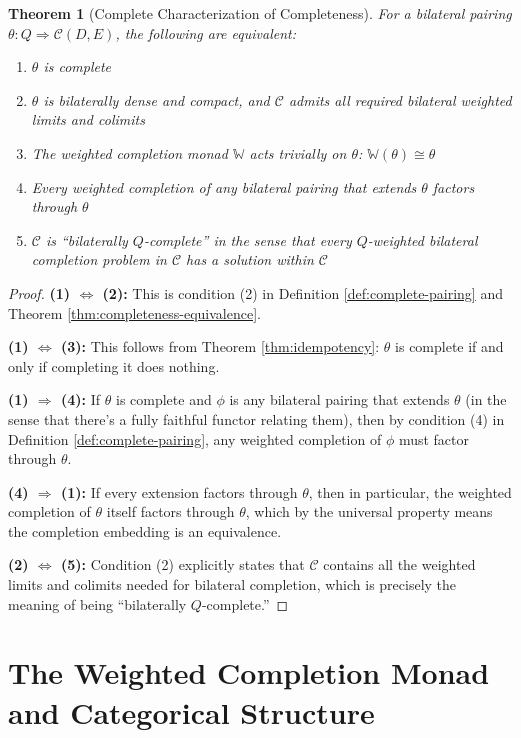 \documentclass[11pt]{article}
\theoremstyle{plain}
\newtheorem{theorem}{Theorem}[section]
\theoremstyle{definition}
\theoremstyle{remark}
\newcommand{\C}{\mathcal{C}}
\begin{document}
\begin{theorem}[Complete Characterization of Completeness]\label{thm:complete-characterization}
For a bilateral pairing $\theta : Q \Rightarrow \C(D, E)$, the following are equivalent:

\begin{enumerate}
\item $\theta$ is complete
\item $\theta$ is bilaterally dense and compact, and $\C$ admits all required bilateral weighted limits and colimits
\item The weighted completion monad $\mathbb{W}$ acts trivially on $\theta$: $\mathbb{W}(\theta) \cong \theta$
\item Every weighted completion of any bilateral pairing that extends $\theta$ factors through $\theta$
\item $\C$ is ``bilaterally $Q$-complete'' in the sense that every $Q$-weighted bilateral completion problem in $\C$ has a solution within $\C$
\end{enumerate}
\end{theorem}

\begin{proof}
\textbf{(1) $\Leftrightarrow$ (2):} This is condition (2) in Definition \ref{def:complete-pairing} and Theorem \ref{thm:completeness-equivalence}.

\textbf{(1) $\Leftrightarrow$ (3):} This follows from Theorem \ref{thm:idempotency}: $\theta$ is complete if and only if completing it does nothing.

\textbf{(1) $\Rightarrow$ (4):} If $\theta$ is complete and $\phi$ is any bilateral pairing that extends $\theta$ (in the sense that there's a fully faithful functor relating them), then by condition (4) in Definition \ref{def:complete-pairing}, any weighted completion of $\phi$ must factor through $\theta$.

\textbf{(4) $\Rightarrow$ (1):} If every extension factors through $\theta$, then in particular, the weighted completion of $\theta$ itself factors through $\theta$, which by the universal property means the completion embedding is an equivalence.

\textbf{(2) $\Leftrightarrow$ (5):} Condition (2) explicitly states that $\C$ contains all the weighted limits and colimits needed for bilateral completion, which is precisely the meaning of being ``bilaterally $Q$-complete.''
\end{proof}

\section{The Weighted Completion Monad and Categorical Structure}
\end{document}
